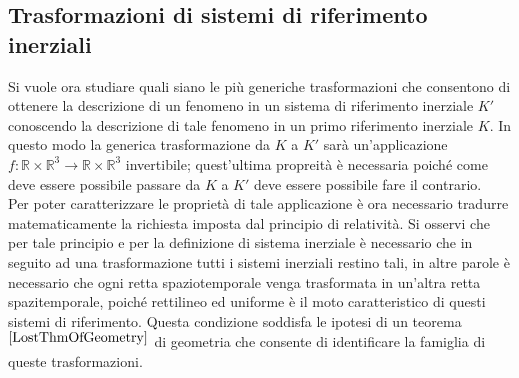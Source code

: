 \subsection{Trasformazioni di sistemi di riferimento inerziali}
Si vuole ora studiare quali siano le più generiche trasformazioni che consentono di ottenere la descrizione di un fenomeno in un sistema di riferimento inerziale $K'$ conoscendo la descrizione di tale fenomeno in un primo riferimento inerziale $K$. In questo modo la generica trasformazione da $K$ a $K'$ sarà un'applicazione $f:\mathbb{R}\times \mathbb{R}^3\rightarrow\mathbb{R}\times \mathbb{R}^3$ invertibile; quest'ultima propreità è necessaria poiché come deve essere possibile passare da $K$ a $K'$ deve essere possibile fare il contrario.\\
Per poter caratterizzare le proprietà di tale applicazione è ora necessario tradurre matematicamente la richiesta imposta dal principio di relatività. Si osservi che per tale principio e per la definizione di sistema inerziale è necessario che in seguito ad una trasformazione tutti i sistemi inerziali restino tali, in altre parole è necessario che ogni retta spaziotemporale venga trasformata in un'altra retta spazitemporale, poiché rettilineo ed uniforme è il moto caratteristico di questi sistemi di riferimento. Questa condizione soddisfa le ipotesi di un teorema$^{\cite{LostThmOfGeometry}}$ di geometria che consente di identificare la famiglia di queste trasformazioni.

